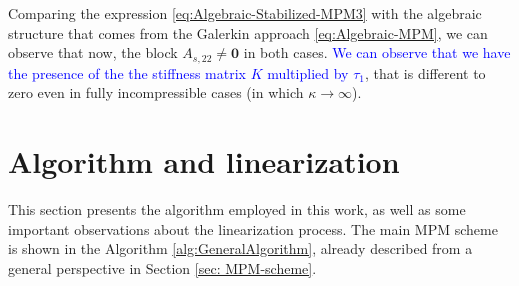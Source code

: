 \documentclass[11pt,english]{article}
\newcommand{\LM}[1]{\textcolor{blue}{#1}}
\begin{document}
\noindent Comparing the expression \eqref{eq:Algebraic-Stabilized-MPM3} with the algebraic structure that comes from the Galerkin approach  \eqref{eq:Algebraic-MPM}, we can observe that now, the block $A_{s,22}\neq \boldsymbol{0}$ in both cases. \LM{We can observe that we have the presence of the the stiffness matrix $K$ multiplied by $\tau_1$}, that is different to zero even in fully incompressible cases (in which $\kappa \rightarrow \infty$).




%
%
  
 \section{Algorithm and linearization} \label{sec:Algorithm}
 
This section presents the algorithm employed in this work, as well as some important observations about the linearization process. The main MPM scheme is shown in the Algorithm \ref{alg:GeneralAlgorithm}, already described from a general perspective in Section \ref{sec: MPM-scheme}. 
   
\end{document}
